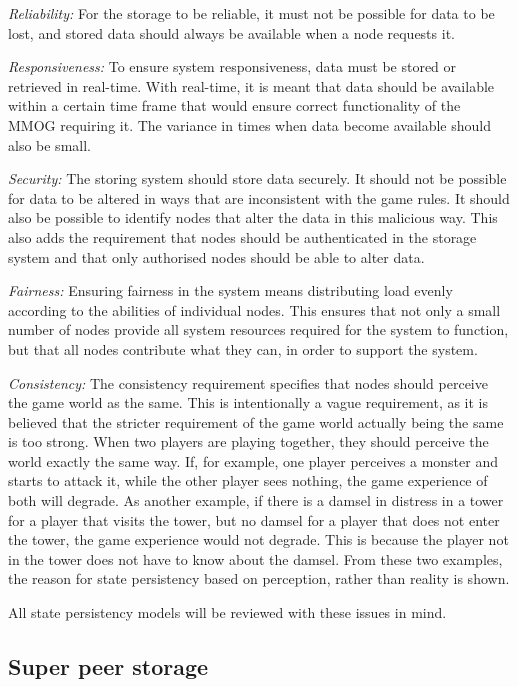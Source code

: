 \documentclass[10pt,a4paper,journal,cspaper,compsoc]{IEEEtran}
\begin{document}
\emph{Reliability:} For the storage to be reliable, it must not be possible for data to be lost, and stored data should always be available when a
    node requests it.

\emph{Responsiveness:} To ensure system responsiveness, data must be stored or retrieved in real-time. With real-time, it is meant that data
    should be available within a certain time frame that would ensure correct functionality of the MMOG requiring it. The variance in times when
    data become available should also be small.

\emph{Security:} The storing system should store data securely. It should not be possible for data to be altered in ways that are inconsistent
    with the game rules. It should also be possible to identify nodes that alter the data in this malicious way. This also adds the requirement
    that nodes should be authenticated in the storage system and that only authorised nodes should be able to alter data.

\emph{Fairness:} Ensuring fairness in the system means distributing load evenly according to the abilities of individual nodes. This ensures that
    not only a small number of nodes provide all system resources required for the system to function, but that all nodes contribute what they
    can, in order to support the system.

\emph{Consistency:} The consistency requirement specifies that nodes should perceive the game world as the same. This is intentionally a vague
    requirement, as it is believed that the stricter requirement of the game world actually being the same is too strong. When two players are
    playing together, they should perceive the world exactly the same way. If, for example, one player perceives a monster and starts to attack
    it, while the other player sees nothing, the game experience of both will degrade. As another example, if there is a damsel in distress in a
    tower for a player that visits the tower, but no damsel for a player that does not enter the tower, the game experience would not degrade.
    This is because the player not in the tower does not have to know about the damsel. From these two examples, the reason for state persistency
    based on perception, rather than reality is shown.


All state persistency models will be reviewed with these issues in mind.

\subsection{Super peer storage}
\end{document}
